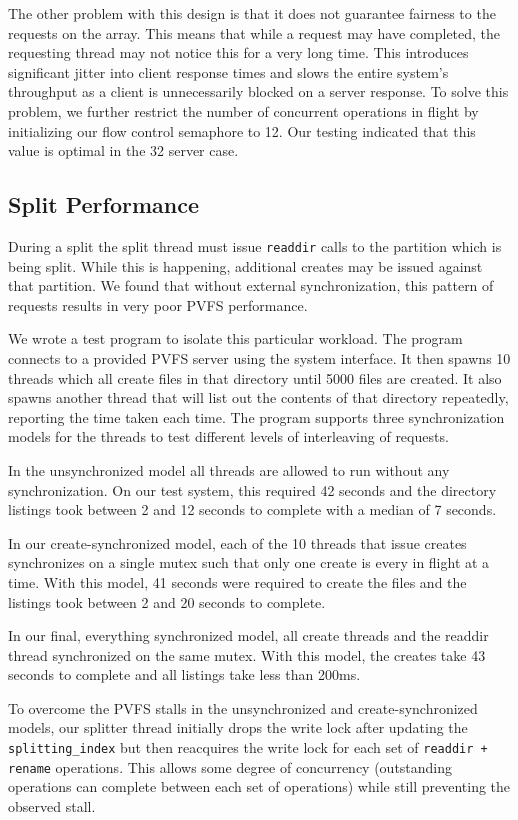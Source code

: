 \documentclass[twocolumn,letterpaper]{article}
\newcommand{\code}[1]{\texttt{#1}}
\begin{document}
The other problem with this design is that it does not guarantee fairness to
the requests on the array.  This means that while a request may have
completed, the requesting thread may not notice this for a very long time.
This introduces significant jitter into client response times and slows the
entire system's throughput as a client is unnecessarily blocked on a server
response.  To solve this problem, we further restrict the number of concurrent
operations in flight by initializing our flow control semaphore to 12.
Our testing indicated that this value is optimal in the 32 server case.

\subsection{Split Performance}
\label{section:splitperf}
During a split the split thread must issue \code{readdir} calls to the
partition which is being split.  While this is happening, additional creates
may be issued against that partition.  We found that without external
synchronization, this pattern of requests results in very poor PVFS
performance.

We wrote a test program to isolate this particular workload.  The program
connects to a provided PVFS server using the system interface.  It then spawns
10 threads which all create files in that directory until 5000 files are
created.  It also spawns another thread that will list out the contents of
that directory repeatedly, reporting the time taken each time.  The program
supports three synchronization models for the threads to test different levels
of interleaving of requests.

In the unsynchronized model all threads are allowed to run without any
synchronization.  On our test system, this required 42 seconds and the
directory listings took between 2 and 12 seconds to complete with a median of
7 seconds.

In our create-synchronized model, each of the 10 threads that issue creates
synchronizes on a single mutex such that only one create is every in flight at
a time.  With this model, 41 seconds were required to create the files and the
listings took between 2 and 20 seconds to complete.

In our final, everything synchronized model, all create threads and the
readdir thread synchronized on the same mutex.  With this model, the creates
take 43 seconds to complete and all listings take less than 200ms.

To overcome the PVFS stalls in the unsynchronized and create-synchronized
models, our splitter thread initially drops the write lock after updating the
\code{splitting\_index} but then reacquires the write lock for each set of
\code{readdir + rename} operations.  This allows some degree of concurrency
(outstanding operations can complete between each set of operations) while
still preventing the observed stall.
\end{document}
